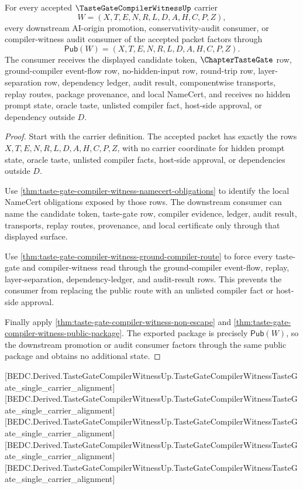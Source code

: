 \begin{theorem}
\label{thm:taste-gate-compiler-witness-mature-downstream-package}
For every accepted $\TasteGateCompilerWitnessUp$ carrier
$$
W=(X,T,E,N,R,L,D,A,H,C,P,Z),
$$
every downstream AI-origin promotion, conservativity-audit consumer, or compiler-witness audit consumer of the accepted packet factors through
$$
\mathsf{Pub}(W)=(X,T,E,N,R,L,D,A,H,C,P,Z).
$$
The consumer receives the displayed candidate token, $\ChapterTasteGate$ row, ground-compiler event-flow row, no-hidden-input row, round-trip row, layer-separation row, dependency ledger, audit result, componentwise transports, replay routes, package provenance, and local NameCert, and receives no hidden prompt state, oracle taste, unlisted compiler fact, host-side approval, or dependency outside $D$.
\end{theorem}
\begin{proof}
Start with the carrier definition. The accepted packet has exactly the rows $X,T,E,N,R,L,D,A,H,C,P,Z$, with no carrier coordinate for hidden prompt state, oracle taste, unlisted compiler facts, host-side approval, or dependencies outside $D$.

Use \autoref{thm:taste-gate-compiler-witness-namecert-obligations} to identify the local NameCert obligations exposed by those rows. The downstream consumer can name the candidate token, taste-gate row, compiler evidence, ledger, audit result, transports, replay routes, provenance, and local certificate only through that displayed surface.

Use \autoref{thm:taste-gate-compiler-witness-ground-compiler-route} to force every taste-gate and compiler-witness read through the ground-compiler event-flow, replay, layer-separation, dependency-ledger, and audit-result rows. This prevents the consumer from replacing the public route with an unlisted compiler fact or host-side approval.

Finally apply \autoref{thm:taste-gate-compiler-witness-non-escape} and \autoref{thm:taste-gate-compiler-witness-public-package}. The exported package is precisely $\mathsf{Pub}(W)$, so the downstream promotion or audit consumer factors through the same public package and obtains no additional state.
\end{proof}

[BEDC.Derived.TasteGateCompilerWitnessUp.TasteGateCompilerWitnessTasteGate\_single\_carrier\_alignment]
[BEDC.Derived.TasteGateCompilerWitnessUp.TasteGateCompilerWitnessTasteGate\_single\_carrier\_alignment]
[BEDC.Derived.TasteGateCompilerWitnessUp.TasteGateCompilerWitnessTasteGate\_single\_carrier\_alignment]
[BEDC.Derived.TasteGateCompilerWitnessUp.TasteGateCompilerWitnessTasteGate\_single\_carrier\_alignment]
[BEDC.Derived.TasteGateCompilerWitnessUp.TasteGateCompilerWitnessTasteGate\_single\_carrier\_alignment]


